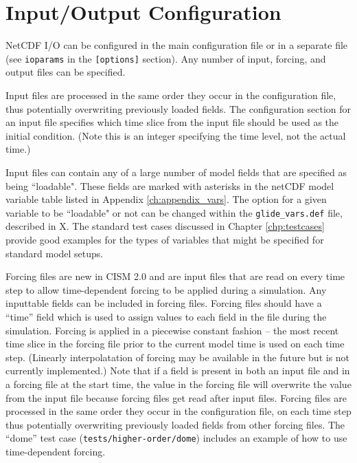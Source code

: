 \section{Input/Output Configuration}

NetCDF I/O can be configured in the main configuration file or in a separate file 
(see \texttt{ioparams} in the \texttt{[options]} section). 
Any number of input, forcing, and output files can be specified. 

Input files are processed in the same order they occur in the configuration file, 
thus potentially overwriting previously loaded fields.  The configuration section 
for an input file specifies which time slice from the input file should be used as
the initial condition.  (Note this is an integer specifying the time level, not
the actual time.)

Input files can contain any of a large number of model fields that are specified as being
``loadable". These fields are marked with asterisks in the netCDF model variable
table listed in Appendix \ref{ch:appendix_vars}. The option for a given variable to be ``loadable" 
or not can be changed within the \texttt{glide\_vars.def} file, described in X. The standard 
test cases discussed in Chapter \ref{chp:testcases} provide good examples for the types 
of variables that might be specified for standard model setups.    

Forcing files are new in CISM 2.0 and are input files that are read on every 
time step to allow time-dependent
forcing to be applied during a simulation.  Any inputtable fields can be included
in forcing files.  Forcing files should have a ``time'' field which is used to 
assign values to each field in the file during the simulation.  Forcing is applied 
in a piecewise constant fashion -- the most recent time slice in the forcing file prior
to the current model time is used on each time step.  (Linearly interpolatation of
forcing may be available in the future but is not currently implemented.)
Note that if a field is present in both an input file and in a
forcing file at the start time, the value in the forcing file will overwrite the value
from the input file because forcing files get read after input files.
Forcing files are processed in the same order they occur in the configuration file, 
on each time step thus potentially overwriting previously loaded fields from other
forcing files.  The ``dome'' test case (\texttt{tests/higher-order/dome}) includes 
an example of how to use time-dependent forcing.


